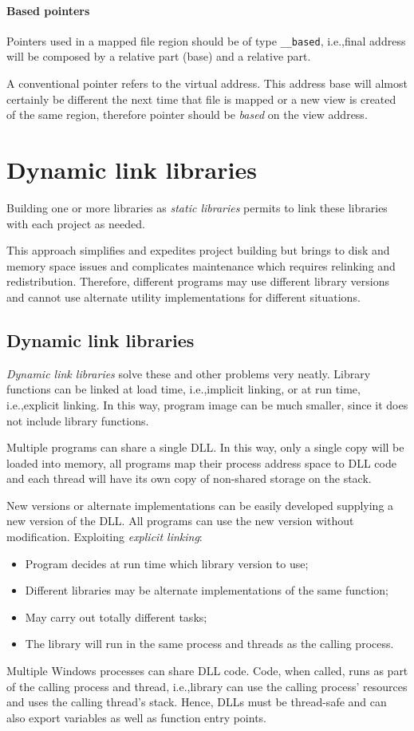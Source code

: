 \paragraph{Based pointers}
Pointers used in a mapped file region should be of type \texttt{\_\_based}, i.e.,\@ final address will be composed by a relative part (base) and a relative part.

A conventional pointer refers to the virtual address. This address base will almost certainly be different the next time that file is mapped or a new view is created of the same region, therefore pointer should be \emph{based} on the view address.

\section{Dynamic link libraries}
Building one or more libraries as \emph{static libraries} permits to link these libraries with each project as needed.

This approach simplifies and expedites project building but brings to disk and memory space issues and complicates maintenance which requires relinking and redistribution. Therefore, different programs may use different library versions and cannot use alternate utility implementations for different situations.

\subsection{Dynamic link libraries}
\emph{Dynamic link libraries} solve these and other problems very neatly. Library functions can be linked at load time, i.e.,\@ implicit linking, or at run time, i.e.,\@ explicit linking. In this way, program image can be much smaller, since it does not include library functions.

Multiple programs can share a single DLL. In this way, only a single copy will be loaded into memory, all programs map their process address space to DLL code and each thread will have its own copy of non-shared storage on the stack.

New versions or alternate implementations can be easily developed supplying a new version of the DLL. All programs can use the new version without modification. Exploiting \emph{explicit linking}:
\begin{itemize}
\item Program decides at run time which library version to use;
\item Different libraries may be alternate implementations of the same function;
\item May carry out totally different tasks;
\item The library will run in the same process and threads as the calling process.
\end{itemize}
Multiple Windows processes can share DLL code. Code, when called, runs as part of the calling process and thread, i.e.,\@ library can use the calling process' resources and uses the calling thread's stack. Hence, DLLs must be thread-safe and can also export variables as well as function entry points.

